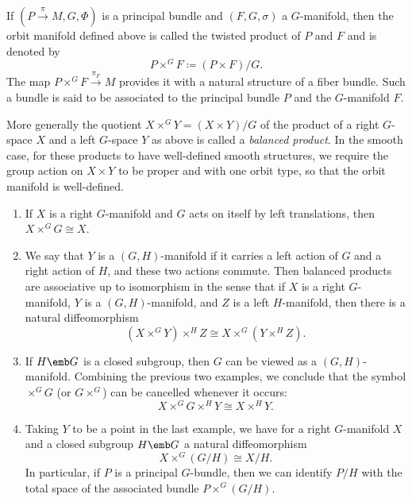 \begin{defn}
    If $(P\overset{\pi}{\to}M,G,\Phi)$ is a principal bundle and  $(F,G,\sigma)$ a $G$-manifold, then the orbit manifold defined above is called the twisted product of $P$ and $F$ and is denoted by
    \[P\times^G F\coloneqq (P\times F)\slash G.\]
    The map $P\times^G F\overset{\pi_F}{\to } M$ provides it with a natural structure of a fiber bundle. Such a bundle is said to be associated to the principal bundle $P$ and the $G$-manifold $F$.
\end{defn}

More generally the quotient $X\times^G Y=(X\times Y)\slash G$ of the product of a right $G$-space $X$ and a left $G$-space $Y$ as above is called a \emph{balanced product}. In the smooth case, for these products to have well-defined smooth structures, we require the group action on $X\times Y$ to be proper and with one orbit type, so that the orbit manifold is well-defined.

\begin{example}
    \begin{enumerate}
        \item If $X$ is a right $G$-manifold and $G$ acts on itself by left translations, then $X\times^G G\cong X$.
        \item We say that $Y$ is a $(G,H)$-manifold if it carries a left action of $G$ and a right action of $H$, and these two actions commute. Then balanced products are associative up to isomorphism in the sense that if $X$ is a right $G$-manifold, $Y$ is a $(G,H)$-manifold, and $Z$ is a left $H$-manifold, then there is a natural diffeomorphism
        \[(X\times^G Y)\times^H Z\cong X\times^G (Y\times^H Z).\]
        \item If $H\emb G$ is a closed subgroup, then $G$ can be viewed as a $(G,H)$-manifold. Combining the previous two examples, we conclude that the symbol $\times^G G$ (or $G\times^G$) can be cancelled whenever it occurs:
        \[X\times^G G\times^H Y\cong X\times^H Y.\]
        \item Taking $Y$ to be a point in the last example, we have for a right $G$-manifold $X$ and a closed subgroup $H\emb G$ a natural diffeomorphism
        \[X\times^G (G\slash H)\cong X\slash H.\]
        In particular, if $P$ is a principal $G$-bundle, then we can identify $P\slash H$ with the total space of the associated bundle $P\times^G (G\slash H)$.
    \end{enumerate}
\end{example}

